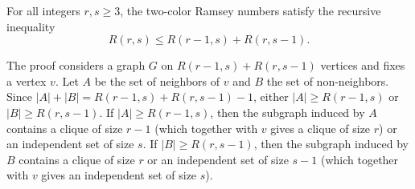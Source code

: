\begin{lemma} \label{lemma:recursive_upper_bound_for_two_color_ramsey_numbers}
For all integers $r, s \geq 3$, the two-color Ramsey numbers satisfy the recursive inequality
$$R(r,s) \leq R(r-1,s) + R(r,s-1).$$

The proof considers a graph $G$ on $R(r-1,s) + R(r,s-1)$ vertices and fixes a vertex $v$. Let $A$ be the set of neighbors of $v$ and $B$ the set of non-neighbors. Since $|A| + |B| = R(r-1,s) + R(r,s-1) - 1$, either $|A| \geq R(r-1,s)$ or $|B| \geq R(r,s-1)$. If $|A| \geq R(r-1,s)$, then the subgraph induced by $A$ contains a clique of size $r-1$ (which together with $v$ gives a clique of size $r$) or an independent set of size $s$. If $|B| \geq R(r,s-1)$, then the subgraph induced by $B$ contains a clique of size $r$ or an independent set of size $s-1$ (which together with $v$ gives an independent set of size $s$).
\end{lemma}
